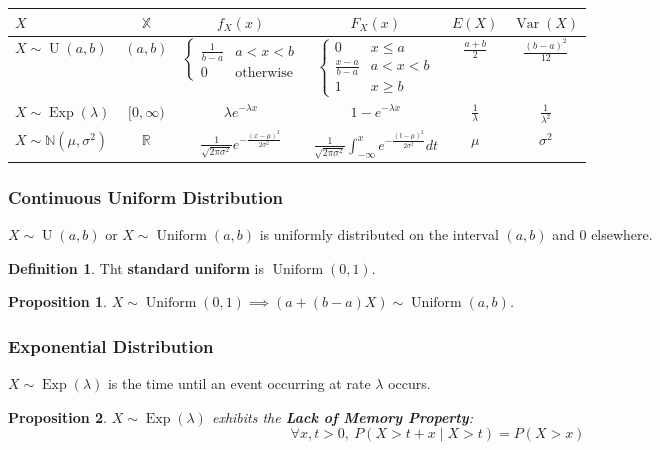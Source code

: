 \documentclass[12pt]{article}
\newtheorem*{prop*}{Proposition}
\theoremstyle{definition}
\newtheorem*{defn*}{Definition}
\newcommand{\R}{\mathbb{R}}
\newcommand{\N}{\mathbb{N}}
\newcommand{\X}{\mathbb{X}}
\DeclareMathOperator{\Var}{Var}
\DeclareMathOperator{\U}{U}
\DeclareMathOperator{\Uniform}{Uniform}
\DeclareMathOperator{\Exp}{Exp}
\begin{document}
\begin{tabular}{lccccc}
  \toprule
  $X$                        & $\X$     & $f_X(x)$ & $F_X(x)$ & $E(X)$ & $\Var(X)$ \\
  \midrule
  $X \sim \U(a, b)$    & $(a, b)$ & $\begin{cases}\frac{1}{b - a} & a < x < b \\ 0 & \text{otherwise}\end{cases}$ & $\begin{cases}0 & x \leq a \\ \frac{x - a}{b - a} & a < x < b \\ 1 & x \geq b\end{cases}$ & $\frac{a + b}{2}$ & $\frac{(b - a)^2}{12}$\\
  $X \sim \Exp(\lambda)$     & $[0, \infty)$ & $\lambda e^{-\lambda x}$ & $1 - e^{-\lambda x}$ & $\frac{1}{\lambda}$ & $\frac{1}{\lambda^2}$ \\
  $X \sim \N(\mu, \sigma^2)$ & $\R$ & $\frac{1}{\sqrt{2\pi\sigma^2}}e^{-\frac{(x - \mu)^2}{2\sigma^2}}$ & $\frac{1}{\sqrt{2\pi\sigma^2}}\int_{-\infty}^xe^{-\frac{(t - \mu)^2}{2\sigma^2}}dt$ & $\mu$ & $\sigma^2$ \\
  \bottomrule
\end{tabular}

\subsubsection{Continuous Uniform Distribution}

$X \sim \U(a, b)$ or $X \sim \Uniform(a, b)$ is uniformly distributed on the interval $(a, b)$ and 0 elsewhere.

\begin{defn*}
  Tht \textbf{standard uniform} is $\Uniform(0, 1)$.
\end{defn*}

\begin{prop*}
  $X \sim \Uniform(0, 1) \implies (a + (b - a)X) \sim \Uniform(a, b)$.
\end{prop*}

\subsubsection{Exponential Distribution}

$X \sim \Exp(\lambda)$ is the time until an event occurring at rate $\lambda$ occurs.

\begin{prop*}
  $X \sim \Exp(\lambda)$ exhibits the \textbf{Lack of Memory Property}:
  $$\forall x, t > 0,\ P(X > t + x \mid X > t) = P(X > x)$$
\end{prop*}
\end{document}
